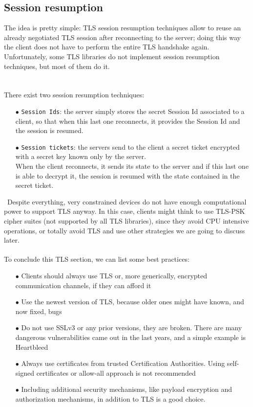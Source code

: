 \documentclass[12pt]{report}
\begin{document}
{\subsection{Session resumption}
\bigskip
The idea is pretty simple: TLS session resumption techniques allow to reuse an already negotiated TLS session after reconnecting to the server; doing this way the client does not have to perform the entire TLS handshake again.\\
Unfortunately, some TLS libraries do not implement session resumption techniques, but most of them do it.\\\\\\
There exist two session resumption techniques:
\begin{itemize}
\setlength{\itemindent}{+4mm}
  \item[$\bullet$] \texttt{Session Ids}: the server simply stores the secret Session Id associated to a client, so that when this last one reconnects, it provides the Session Id and the session is resumed.
  \item[$\bullet$] \texttt{Session tickets}: the servers send to the client a secret ticket encrypted with a secret key known only by the server.\\
  When the client reconnects, it sends its state to the server and if this last one is able to decrypt it, the session is resumed with the state contained in the secret ticket.
\end{itemize}\
Despite everything, very constrained devices do not have enough computational power to support TLS anyway. 
In this case, clients might think to use TLS-PSK cipher suites (not supported by all TLS libraries), since they avoid CPU intensive operations, or totally avoid TLS and use other strategies we are going to discuss later.\\\\

To conclude this TLS section, we can list some best practices:

\begin{itemize}
\setlength{\itemindent}{+4mm}
  \item[$\bullet$] Clients should always use TLS or, more generically, encrypted communication channels, if they can afford it
  \item[$\bullet$] Use the newest version of TLS, because older ones might have known, and now fixed, bugs
  \item[$\bullet$] Do not use SSLv3 or any prior versions, they are broken. There are many dangerous vulnerabilities came out in the last years, and a simple example is Heartbleed
  \item[$\bullet$] Always use certificates from trusted Certification Authorities. Using self-signed certificates or allow-all approach is not recommended
  \item[$\bullet$] Including additional security mechanisms, like payload encryption and authorization mechanisms, in addition to TLS is a good choice.


\end{itemize}}
\end{document}
